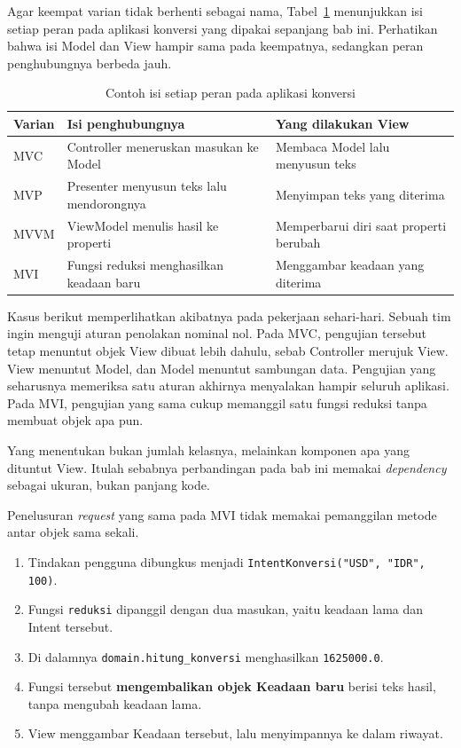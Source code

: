 Agar keempat varian tidak berhenti sebagai nama, Tabel~\ref{tab:contoh-mv}
menunjukkan isi setiap peran pada aplikasi konversi yang dipakai sepanjang bab
ini. Perhatikan bahwa isi Model dan View hampir sama pada keempatnya, sedangkan
peran penghubungnya berbeda jauh.

\begin{table}[htbp]
  \centering
  \caption{Contoh isi setiap peran pada aplikasi konversi}
  \label{tab:contoh-mv}
  \begin{tabularx}{\textwidth}{|l|X|X|}
    \hline
    \textbf{Varian} & \textbf{Isi penghubungnya} & \textbf{Yang dilakukan View} \\
    \hline
    MVC & Controller meneruskan masukan ke Model & Membaca Model lalu menyusun teks \\
    \hline
    MVP & Presenter menyusun teks lalu mendorongnya & Menyimpan teks yang diterima \\
    \hline
    MVVM & ViewModel menulis hasil ke properti & Memperbarui diri saat properti berubah \\
    \hline
    MVI & Fungsi reduksi menghasilkan keadaan baru & Menggambar keadaan yang diterima \\
    \hline
  \end{tabularx}
\end{table}

Kasus berikut memperlihatkan akibatnya pada pekerjaan sehari-hari. Sebuah tim
ingin menguji aturan penolakan nominal nol. Pada MVC, pengujian tersebut tetap
menuntut objek View dibuat lebih dahulu, sebab Controller merujuk View. View
menuntut Model, dan Model menuntut sambungan data. Pengujian yang seharusnya
memeriksa satu aturan akhirnya menyalakan hampir seluruh aplikasi. Pada MVI,
pengujian yang sama cukup memanggil satu fungsi reduksi tanpa membuat objek apa
pun.

Yang menentukan bukan jumlah kelasnya, melainkan komponen apa yang dituntut
View. Itulah sebabnya perbandingan pada bab ini memakai \textit{dependency} sebagai
ukuran, bukan panjang kode.

Penelusuran \textit{request} yang sama pada MVI tidak memakai pemanggilan metode
antar objek sama sekali.

\begin{enumerate}
  \item Tindakan pengguna dibungkus menjadi
    \texttt{IntentKonversi("USD", "IDR", 100)}.
  \item Fungsi \texttt{reduksi} dipanggil dengan dua masukan, yaitu keadaan lama
    dan Intent tersebut.
  \item Di dalamnya \texttt{domain.hitung\_konversi} menghasilkan
    \texttt{1625000.0}.
  \item Fungsi tersebut \textbf{mengembalikan objek Keadaan baru} berisi teks
    hasil, tanpa mengubah keadaan lama.
  \item View menggambar Keadaan tersebut, lalu menyimpannya ke dalam riwayat.
\end{enumerate}

